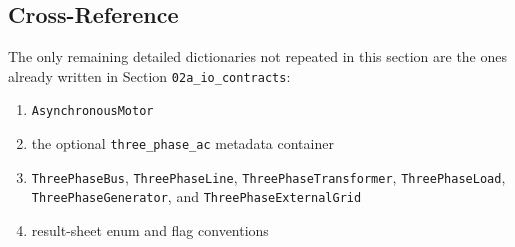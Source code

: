 \subsection{Cross-Reference}

The only remaining detailed dictionaries not repeated in this section are the
ones already written in Section \texttt{02a\_io\_contracts}:
\begin{enumerate}
  \item \texttt{AsynchronousMotor}
  \item the optional \texttt{three\_phase\_ac} metadata container
  \item \texttt{ThreePhaseBus}, \texttt{ThreePhaseLine}, \texttt{ThreePhaseTransformer}, \texttt{ThreePhaseLoad}, \texttt{ThreePhaseGenerator}, and \texttt{ThreePhaseExternalGrid}
  \item result-sheet enum and flag conventions
\end{enumerate}

\normalsize
